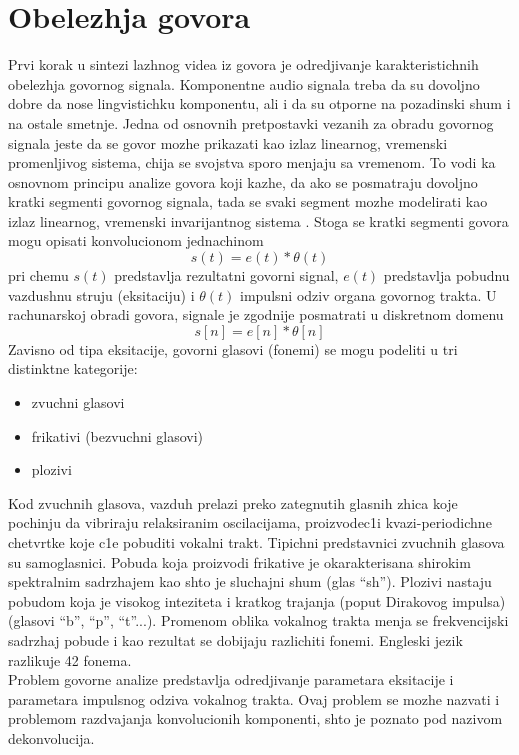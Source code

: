 \documentclass[a4paper, openany, oneside, 11pt]{book}
\begin{document}
\chapter{Obelezhja govora}\label{X}
Prvi korak u sintezi lazhnog videa iz govora je odredjivanje karakteristichnih obelezhja govornog signala. Komponentne audio signala treba da su dovoljno dobre da nose lingvistichku komponentu, ali i da su otporne na pozadinski shum i na ostale smetnje.
Jedna od osnovnih pretpostavki vezanih za obradu govornog signala jeste da se govor mozhe prikazati kao izlaz linearnog, vremenski promenljivog sistema, chija se svojstva sporo menjaju sa vremenom. To vodi ka osnovnom principu analize govora koji kazhe, da ako se posmatraju dovoljno kratki segmenti govornog signala, tada se svaki segment mozhe modelirati kao izlaz linearnog, vremenski invarijantnog sistema \cite{OPGpredavanja}. Stoga se kratki segmenti govora mogu opisati konvolucionom jednachinom
\begin{equation}\label{eq:1.1}
s(t) = e(t)*\theta(t)
\end{equation}
pri chemu $s(t)$ predstavlja rezultatni govorni signal, $e(t)$ predstavlja pobudnu vazdushnu struju (eksitaciju) i $\theta(t)$ impulsni odziv organa govornog trakta. U rachunarskoj obradi govora, signale je zgodnije posmatrati u diskretnom domenu
\begin{equation}
s[n] = e[n]*\theta[n]
\end{equation}
Zavisno od tipa eksitacije, govorni glasovi (fonemi) se mogu podeliti u tri distinktne kategorije:
\begin{itemize}[noitemsep]
\item zvuchni glasovi
\item frikativi (bezvuchni glasovi)
\item plozivi
\end{itemize}
Kod zvuchnih glasova, vazduh prelazi preko zategnutih glasnih zhica koje po\-chinju da vibriraju relaksiranim oscilacijama, proizvodec1i kvazi-periodichne chetvrtke koje c1e pobuditi vokalni trakt. Tipichni predstavnici zvuchnih glasova su samoglasnici. Pobuda koja proizvodi frikative je okarakterisana shirokim spektralnim sadrzhajem kao shto je sluchajni shum (glas \enquote{sh}). Plozivi nastaju pobudom koja je visokog inteziteta i kratkog trajanja (poput Dirakovog impulsa) (glasovi \enquote{b}, \enquote{p}, \enquote{t}...). Promenom oblika vokalnog trakta menja se frekvencijski sadrzhaj pobude i kao rezultat se dobijaju razlichiti fonemi. Engleski jezik razlikuje 42 fonema.\\
Problem govorne analize predstavlja odredjivanje parametara eksitacije i parametara impulsnog odziva vokalnog trakta. Ovaj problem se mozhe nazvati i problemom razdvajanja konvolucionih komponenti, shto je poznato pod nazivom dekonvolucija.
\end{document}
